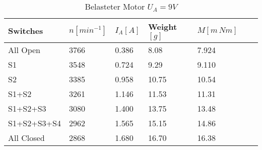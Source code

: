 \begin{table}[htbp]
   \centering
   \begin{tabularx}{\columnwidth}{XXXXXXX}
      \toprule
      Switches    & $n [min^{-1}]$ & $I_A [A]$ & Weight$[g]$ & $M[m\, Nm]$ \\
      \midrule
      All Open    & 3766           & 0.386     & 8.08        & 7.924       \\
      S1          & 3548           & 0.724     & 9.29        & 9.110       \\
      S2          & 3385           & 0.958     & 10.75       & 10.54       \\
      S1+S2       & 3261           & 1.146     & 11.53       & 11.31       \\
      S1+S2+S3    & 3080           & 1.400     & 13.75       & 13.48       \\
      S1+S2+S3+S4 & 2962           & 1.565     & 15.15       & 14.86       \\
      All Closed  & 2868           & 1.680     & 16.70       & 16.38       \\
      \bottomrule
   \end{tabularx}
   \caption{Belasteter Motor $U_A=9V$}
\end{table}